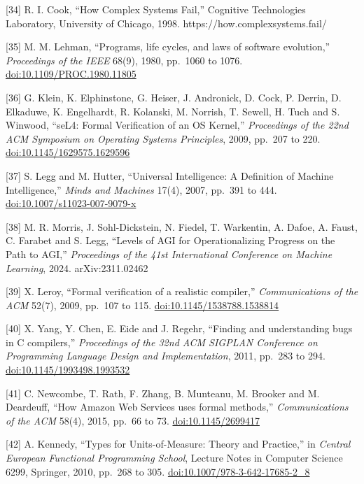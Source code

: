 \documentclass[
  10pt,
]{article}
\begin{document}
{[}34{]} R. I. Cook, ``How Complex Systems Fail,'' Cognitive
Technologies Laboratory, University of Chicago, 1998.
https://how.complexsystems.fail/

{[}35{]} M. M. Lehman, ``Programs, life cycles, and laws of software
evolution,'' \emph{Proceedings of the IEEE} 68(9), 1980, pp.~1060 to
1076.
\href{https://doi.org/10.1109/PROC.1980.11805}{doi:10.1109/PROC.1980.11805}

{[}36{]} G. Klein, K. Elphinstone, G. Heiser, J. Andronick, D. Cock, P.
Derrin, D. Elkaduwe, K. Engelhardt, R. Kolanski, M. Norrish, T. Sewell,
H. Tuch and S. Winwood, ``seL4: Formal Verification of an OS Kernel,''
\emph{Proceedings of the 22nd ACM Symposium on Operating Systems
Principles}, 2009, pp.~207 to 220.
\href{https://doi.org/10.1145/1629575.1629596}{doi:10.1145/1629575.1629596}

{[}37{]} S. Legg and M. Hutter, ``Universal Intelligence: A Definition
of Machine Intelligence,'' \emph{Minds and Machines} 17(4), 2007,
pp.~391 to 444.
\href{https://doi.org/10.1007/s11023-007-9079-x}{doi:10.1007/s11023-007-9079-x}

{[}38{]} M. R. Morris, J. Sohl-Dickstein, N. Fiedel, T. Warkentin, A.
Dafoe, A. Faust, C. Farabet and S. Legg, ``Levels of AGI for
Operationalizing Progress on the Path to AGI,'' \emph{Proceedings of the
41st International Conference on Machine Learning}, 2024.
arXiv:2311.02462

{[}39{]} X. Leroy, ``Formal verification of a realistic compiler,''
\emph{Communications of the ACM} 52(7), 2009, pp.~107 to 115.
\href{https://doi.org/10.1145/1538788.1538814}{doi:10.1145/1538788.1538814}

{[}40{]} X. Yang, Y. Chen, E. Eide and J. Regehr, ``Finding and
understanding bugs in C compilers,'' \emph{Proceedings of the 32nd ACM
SIGPLAN Conference on Programming Language Design and Implementation},
2011, pp.~283 to 294.
\href{https://doi.org/10.1145/1993498.1993532}{doi:10.1145/1993498.1993532}

{[}41{]} C. Newcombe, T. Rath, F. Zhang, B. Munteanu, M. Brooker and M.
Deardeuff, ``How Amazon Web Services uses formal methods,''
\emph{Communications of the ACM} 58(4), 2015, pp.~66 to 73.
\href{https://doi.org/10.1145/2699417}{doi:10.1145/2699417}

{[}42{]} A. Kennedy, ``Types for Units-of-Measure: Theory and
Practice,'' in \emph{Central European Functional Programming School},
Lecture Notes in Computer Science 6299, Springer, 2010, pp.~268 to 305.
\href{https://doi.org/10.1007/978-3-642-17685-2_8}{doi:10.1007/978-3-642-17685-2\_8}
\end{document}
